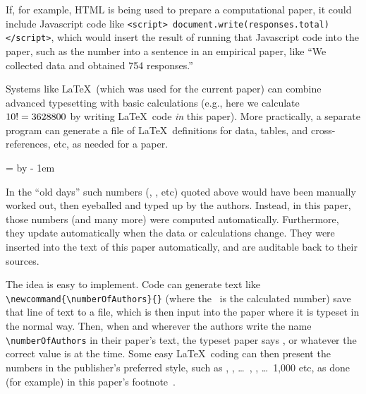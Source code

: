 \documentclass{comjnl}
\begin{document}
If, for example, HTML is being used to prepare a computational paper, it could include Javascript code like \texttt{<script> document.write(responses.total) </script>}, which would insert the result of running that Javascript code into the paper, such as the number into a sentence in an empirical paper, like ``We collected data and obtained 754 responses.'' 

Systems like \LaTeX\ (which was used for the current paper) can combine advanced typesetting with basic calculations (e.g., here we calculate $10!=
\def\factorial#1{\ffactorial{#1}1}
\newcount\t
\def\ffactorial#1#2{%
\ifnum#1=0 #2\else
\ffactorial{\the\numexpr#1-1\relax}{\the\numexpr#1*#2\relax}%
\fi}
\factorial{10}$ by writing \LaTeX\ code \emph{in\/} this paper). More practically, a separate program can generate a file of \LaTeX\ definitions for data, tables, and cross-references, etc, as needed for a paper. 

\newdimen\boxwidth
\boxwidth = \columnwidth
\advance\boxwidth by - 1em
\noindent{}

In the ``old days'' such numbers (\the\dataN, \the\countAuthors, etc) quoted above would have been manually worked out, then eyeballed and typed up by the authors. Instead, in this paper, those numbers (and many more) were computed automatically. Furthermore, they update automatically when the data or calculations change. They were inserted into the text of this paper automatically, and are auditable back to their sources.  

The idea is easy to implement. Code can generate text like \texttt{\textbackslash newcommand\{\textbackslash numberOfAuthors\}\{\the\countAuthors\}} (where the \the\countAuthors\ is the calculated number) save that line of text to a file, which is then input into the paper where it is typeset in the normal way. Then, when and wherever the authors write the name \texttt{\textbackslash numberOfAuthors} in their paper's text, the typeset paper says \the\countAuthors, or whatever the correct value is at the time. Some easy \LaTeX\ coding can then present the numbers in the publisher's preferred style, such as , , \ldots\ , ,  \ldots\ 1,000 etc, as done (for example) in this paper's footnote~\numbernamesexamplefootnote. 
\end{document}
